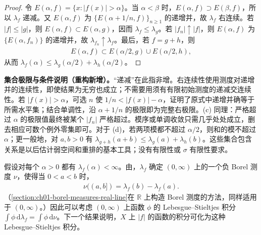 \documentclass[../../main.tex]{subfiles}
\begin{document}
\begin{proof}
令 $E(\alpha,f)=\{x:|f(x)|>\alpha\}$。当 $\alpha<\beta$ 时，$E(\alpha,f)\supset E(\beta,f)$，所以 $\lambda_f$ 递减。又 $E(\alpha,f)$ 为 $\{E(\alpha+1/n,f)\}_{n\geqslant1}$ 的递增并，故 $\lambda_f$ 右连续。若 $|f|\leqslant|g|$，则 $E(\alpha,f)\subset E(\alpha,g)$，因而 $\lambda_f\leqslant\lambda_g$。若 $|f_n|\uparrow|f|$，则 $E(\alpha,f)$ 为 $\{E(\alpha,f_n)\}$ 的递增并，故 $\lambda_{f_n}\uparrow\lambda_f$。最后，若 $f=g+h$，则
\begin{align*}
E(\alpha,f)\subset E(\alpha/2,g)\cup E(\alpha/2,h),
\end{align*}
从而 $\lambda_f(\alpha)\leqslant\lambda_g(\alpha/2)+\lambda_h(\alpha/2)$。
\end{proof}
\begin{remark}
\textbf{集合极限与条件说明（重构新增）。}“递减”在此指非增。右连续性使用测度对递增并的连续性，即使结果为无穷也成立；不需要用须有有限初始测度的递减交连续性。若 $|f(x)|>\alpha$，可选 $n$ 使 $1/n<|f(x)|-\alpha$，证明了原式中递增并确等于所需水平集；结合单调性，沿 $\alpha+1/n$ 的极限即为完整右极限。(c) 同理：严格超过 $\alpha$ 的极限值最终被某个 $|f_n|$ 严格超过。模序或单调收敛只需几乎处处成立，删去相应可数个例外零集即可。对于 (d)，若两项模都不超过 $\alpha/2$，则和的模不超过 $\alpha$；更一般地，对 $a,b>0$ 有 $\lambda_{g+h}(a+b)\leqslant\lambda_g(a)+\lambda_h(b)$。这些集合包含关系是以后估计弱空间和重排的基本工具；没有有限性或 $\sigma$ 有限性要求。
\end{remark}
假设对每个 $\alpha>0$ 都有 $\lambda_f(\alpha)<\infty$。由，$\lambda_f$ 确定 $(0,\infty)$ 上的一个负 Borel 测度 $\nu$，使得当 $0<a<b$ 时，
\begin{align*}
\nu((a,b])=\lambda_f(b)-\lambda_f(a).
\end{align*}
（\cref{section:ch01-borel-measures-real-line}在 $\mathbb R$ 上构造 Borel 测度的方法，同样适用于 $(0,\infty)$。）因此可以考虑 $(0,\infty)$ 上函数 $\phi$ 的 Lebesgue–Stieltjes 积分 $\int\phi\,\mathrm d\lambda_f=\int\phi\,\mathrm d\nu$。下一个结果说明，$X$ 上 $|f|$ 的函数的积分可化为这种 Lebesgue–Stieltjes 积分。
\end{document}
